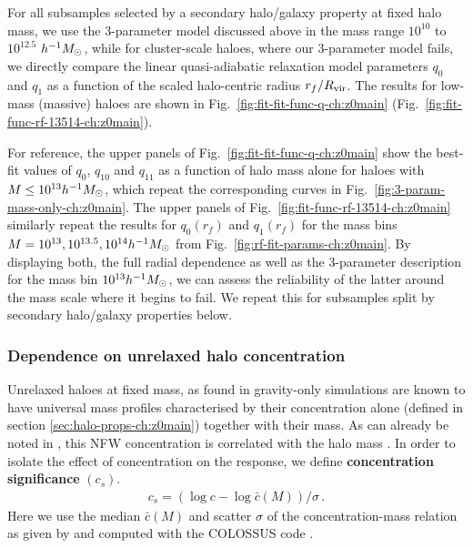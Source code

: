 For all subsamples selected by a secondary halo/galaxy property at fixed halo mass, we use the 3-parameter model discussed above in the mass range $10^{10}$ to $10^{12.5}$ $h^{-1}M_{\odot}$, 
while for cluster-scale haloes, where our 3-parameter model fails, we directly compare the linear quasi-adiabatic relaxation model parameters $q_0$ and $q_1$ as a function of the scaled halo-centric radius $r_f/R_{\rm vir}$. The results for low-mass (massive) haloes are shown in Fig.~\ref{fig:fit-fit-func-q-ch:z0main} (Fig.~\ref{fig:fit-func-rf-13514-ch:z0main}).


For reference, the upper panels of Fig.~\ref{fig:fit-fit-func-q-ch:z0main} show the best-fit values of $q_0$, $q_{10}$ and $q_{11}$ as a function of halo mass alone for haloes with $M\leq10^{13}h^{-1}M_{\odot}$,
which repeat the corresponding curves in Fig.~\ref{fig:3-param-mass-only-ch:z0main}. The upper panels of Fig.~\ref{fig:fit-func-rf-13514-ch:z0main} similarly repeat the results for $q_0(r_f)$ and $q_1(r_f)$ for the mass bins $M=10^{13},10^{13.5},10^{14}h^{-1}M_{\odot}$ from Fig.~\ref{fig:rf-fit-params-ch:z0main}. By displaying both, the full radial dependence as well as the 3-parameter description for the mass bin $10^{13}h^{-1}M_{\odot}$, we can assess the reliability of the latter around the mass scale where it begins to fail. We repeat this for subsamples split by secondary halo/galaxy properties below.



\subsubsection{Dependence on unrelaxed halo concentration}
Unrelaxed haloes at fixed mass, as found in gravity-only simulations are known to have universal mass profiles characterised by their concentration alone (defined in section \ref{sec:halo-props-ch:z0main}) together with their mass.
As can already be noted in , this NFW concentration is correlated with the halo mass \citep[see e.g. ][]{2006ApJ...652...71W,2007MNRAS.378...55M,2015ApJ...799..108D,2017MNRAS.468.2984P}.
In order to isolate the effect of concentration on the response, we define \textbf{concentration significance} $(c_s)$.
\begin{align}
c_s = \left(\log c- \log \bar{c}(M)\right)/\sigma\,. \nonumber
\end{align}
Here we use the median $\bar{c}(M)$ and scatter $\sigma$ of the concentration-mass relation as given by \citet{2019ApJ...871..168D} and computed with the COLOSSUS code \citep[][]{2018ApJS..239...35D}.

